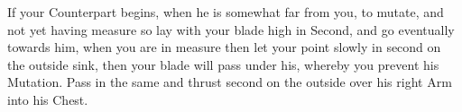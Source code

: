 \Exercise {}

If your Counterpart begins, when he is somewhat far from you, to
mutate, and not yet having measure so lay with your blade high in
Second, and go eventually towards him, when you are in measure then
let your point slowly in second on the outside sink, then your blade
will pass under his, whereby you prevent his Mutation. Pass in the
same and thrust second on the outside over his right Arm into his
Chest.
